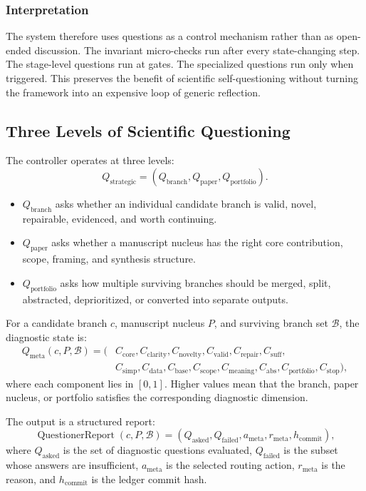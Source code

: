 \documentclass[11pt]{article}
\begin{document}
\subsubsection*{Interpretation}
The system therefore uses questions as a control mechanism rather than as open-ended discussion. The invariant micro-checks run after every state-changing step. The stage-level questions run at gates. The specialized questions run only when triggered. This preserves the benefit of scientific self-questioning without turning the framework into an expensive loop of generic reflection.

\subsection{Three Levels of Scientific Questioning}

The controller operates at three levels:
$$
Q_{\mathrm{strategic}}=(Q_{\mathrm{branch}},Q_{\mathrm{paper}},Q_{\mathrm{portfolio}}).
$$

\begin{itemize}[leftmargin=*]
    \item $Q_{\mathrm{branch}}$ asks whether an individual candidate branch is valid, novel, repairable, evidenced, and worth continuing.
    \item $Q_{\mathrm{paper}}$ asks whether a manuscript nucleus has the right core contribution, scope, framing, and synthesis structure.
    \item $Q_{\mathrm{portfolio}}$ asks how multiple surviving branches should be merged, split, abstracted, deprioritized, or converted into separate outputs.
\end{itemize}

For a candidate branch $c$, manuscript nucleus $P$, and surviving branch set $\mathcal{B}$, the diagnostic state is:
$$
\begin{aligned}
Q_{\mathrm{meta}}(c,P,\mathcal{B})=(
&C_{\mathrm{core}},C_{\mathrm{clarity}},C_{\mathrm{novelty}},C_{\mathrm{valid}},C_{\mathrm{repair}},C_{\mathrm{suff}},\\
&C_{\mathrm{simp}},C_{\mathrm{data}},C_{\mathrm{base}},C_{\mathrm{scope}},C_{\mathrm{meaning}},C_{\mathrm{abs}},C_{\mathrm{portfolio}},C_{\mathrm{stop}}),
\end{aligned}
$$
where each component lies in $[0,1]$. Higher values mean that the branch, paper nucleus, or portfolio satisfies the corresponding diagnostic dimension.

The output is a structured report:
$$
\operatorname{QuestionerReport}(c,P,\mathcal{B})=
(Q_{\mathrm{asked}},Q_{\mathrm{failed}},a_{\mathrm{meta}},r_{\mathrm{meta}},h_{\mathrm{commit}}),
$$
where $Q_{\mathrm{asked}}$ is the set of diagnostic questions evaluated, $Q_{\mathrm{failed}}$ is the subset whose answers are insufficient, $a_{\mathrm{meta}}$ is the selected routing action, $r_{\mathrm{meta}}$ is the reason, and $h_{\mathrm{commit}}$ is the ledger commit hash.
\end{document}
